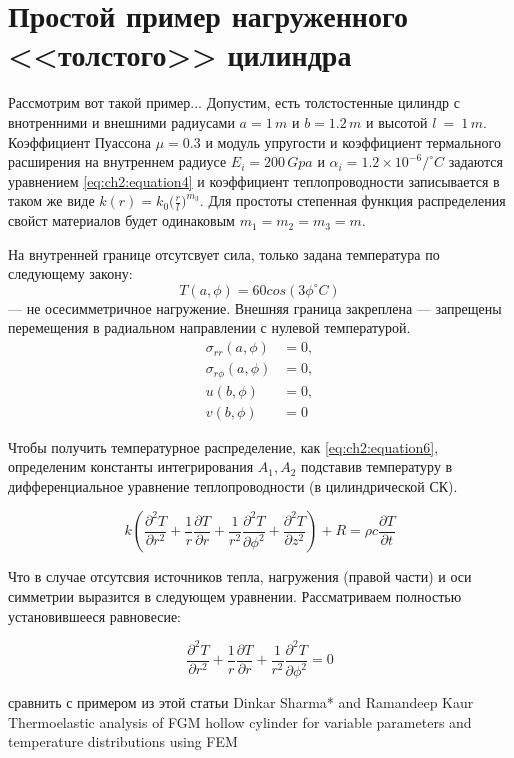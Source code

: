 \chapter{Простой пример нагруженного <<толстого>> цилиндра} \label{ch:example1}

Рассмотрим вот такой пример...
Допустим, есть толстостенные цилиндр с внотренними и внешними радиусами \(a=1\,m\) и \(b=1.2\,m\) и высотой \(l~=~1\,m\). Коэффициент Пуассона \(\mu=0.3\) и модуль упругости и коэффициент термального расширения на внутреннем радиусе \(E_i = 200\,Gpa\) и \(\alpha_i = 1.2 \times 10^{-6} /^{\circ}C\) задаются уравнением \cref{eq:ch2:equation4} и коэффициент теплопроводности записывается в таком же виде \( k(r) = k_0 \big ( \frac{r}{l} \big ) ^ {m_3} \). Для простоты степенная функция распределения свойст материалов будет одинаковым \(m_1=m_2=m_3=m\).

На внутренней границе отсутсвует сила, только задана температура по следующему закону:
\begin{equation}
\label{eq:example1:1}
	T(a, \phi) = 60 cos (3\phi^{\circ}C)
\end{equation}
 --- не осесимметричное нагружение. Внешняя граница закреплена --- запрещены перемещения в радиальном направлении с нулевой температурой. 
\begin{equation}
\label{eq:example1:2}
\begin{split}
	\sigma_{rr}(a, \phi) &= 0,\\
	\sigma_{r\phi}(a, \phi) &= 0,\\
	u(b, \phi) &= 0,\\
	v(b, \phi) &= 0
\end{split}
\end{equation}

Чтобы получить температурное распределение, как \cref{eq:ch2:equation6}, определеним константы интегрирования \(A_1, A_2\) подставив температуру в дифференциальное уравнение теплопроводности (в цилиндрической СК).

\begin{equation}
\label{eq:example1:3}
	k \left(\frac{\partial^2 T}{\partial r^2} +\frac{1}{r}\frac{\partial T}{\partial r} +\frac{1}{r^2}\frac{\partial^2 T}{\partial \phi^2} +\frac{\partial^2 T}{\partial z^2} \right) +R = \rho c \frac{\partial T}{\partial t}
\end{equation}

Что в случае отсутсвия источников тепла, нагружения (правой части) и оси симметрии выразится в следующем уравнении. Рассматриваем полностью установившееся равновесие:

\begin{equation}
\label{eq:example1:4}
	\frac{\partial^2 T}{\partial r^2} + \frac{1}{r} \frac{\partial T}{\partial r} +\frac{1}{r^2} \frac{\partial ^2 T}{\partial \phi^2} = 0
\end{equation}

сравнить с примером из этой статьи
Dinkar Sharma* and Ramandeep Kaur
Thermoelastic analysis of FGM hollow cylinder for
variable parameters and temperature
distributions using FEM